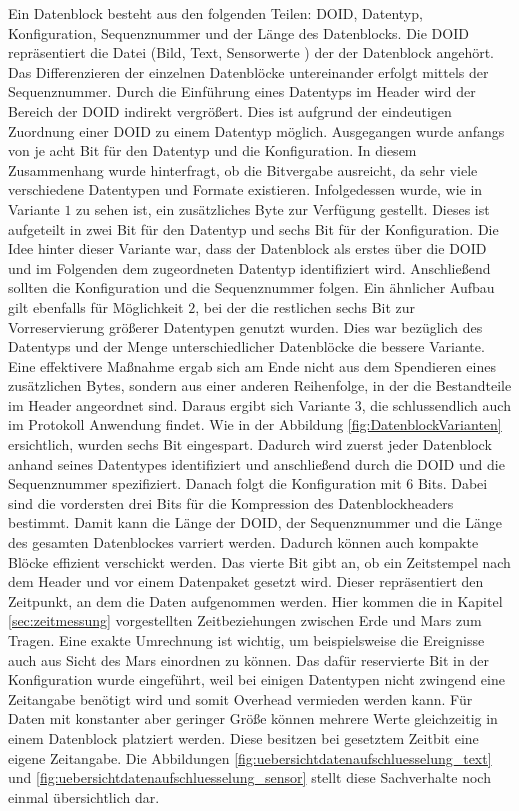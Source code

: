 Ein Datenblock besteht aus den folgenden Teilen: \gls{DOID}, Datentyp,
Konfiguration, Sequenznummer und der Länge des Datenblocks. Die \gls{DOID}
repräsentiert die Datei (Bild, Text, Sensorwerte \etc) der der Datenblock
angehört. Das Differenzieren der einzelnen Datenblöcke untereinander erfolgt
mittels der Sequenznummer. Durch die Einführung eines Datentyps im Header wird
der Bereich der \gls{DOID} indirekt vergrößert. Dies ist aufgrund der
eindeutigen Zuordnung einer \gls{DOID} zu einem Datentyp möglich.
\newline
Ausgegangen wurde anfangs von je acht Bit für den Datentyp und
die Konfiguration.
In diesem Zusammenhang wurde hinterfragt, ob die Bitvergabe ausreicht,
da sehr viele verschiedene Datentypen und Formate existieren. Infolgedessen
wurde, wie in Variante $1$ zu sehen ist, ein zusätzliches Byte zur Verfügung
gestellt. Dieses ist aufgeteilt in zwei Bit für den Datentyp und sechs Bit für
der Konfiguration. Die Idee hinter dieser Variante war, dass der Datenblock als
erstes über die \gls{DOID} und im Folgenden dem zugeordneten Datentyp identifiziert
wird. Anschließend sollten die Konfiguration und die Sequenznummer folgen.
\newline
Ein ähnlicher Aufbau gilt ebenfalls für Möglichkeit $2$, bei der die restlichen
sechs Bit zur Vorreservierung größerer Datentypen genutzt wurden. Dies war
bezüglich des Datentyps und der Menge unterschiedlicher Datenblöcke die bessere
Variante. 
\newline
Eine effektivere Maßnahme ergab sich am Ende nicht aus dem Spendieren eines
zusätzlichen Bytes, sondern aus einer anderen Reihenfolge, in der die
Bestandteile im Header angeordnet sind. Daraus ergibt sich Variante $3$, die
schlussendlich auch im Protokoll Anwendung findet. Wie in der Abbildung
\ref{fig:DatenblockVarianten} ersichtlich, wurden sechs Bit eingespart. Dadurch
wird zuerst jeder Datenblock anhand seines Datentypes identifiziert und
anschließend durch die \gls{DOID} und die Sequenznummer spezifiziert. Danach
folgt die Konfiguration mit $6$ Bits. Dabei sind die vordersten drei Bits für
die Kompression des Datenblockheaders bestimmt. Damit kann die Länge der
\gls{DOID}, der Sequenznummer und die Länge des gesamten Datenblockes varriert
werden. Dadurch können auch kompakte Blöcke effizient verschickt werden.
Das vierte Bit gibt an, ob ein Zeitstempel nach dem Header und vor einem
Datenpaket gesetzt wird. Dieser repräsentiert den Zeitpunkt, an dem die Daten
aufgenommen werden. Hier kommen die in Kapitel \ref{sec:zeitmessung}
vorgestellten Zeitbeziehungen zwischen Erde und Mars zum Tragen. Eine
exakte Umrechnung ist wichtig, um beispielsweise die Ereignisse auch
aus Sicht des Mars einordnen zu können. Das dafür reservierte Bit in der
Konfiguration wurde eingeführt, weil bei einigen Datentypen nicht zwingend eine
Zeitangabe benötigt wird und somit Overhead vermieden werden kann. Für Daten mit
konstanter aber geringer Größe können mehrere Werte gleichzeitig in einem
Datenblock platziert werden. Diese besitzen bei gesetztem Zeitbit eine eigene
Zeitangabe. Die Abbildungen \ref{fig:uebersichtdatenaufschluesselung_text} und
\ref{fig:uebersichtdatenaufschluesselung_sensor} stellt diese Sachverhalte noch
einmal übersichtlich dar.

